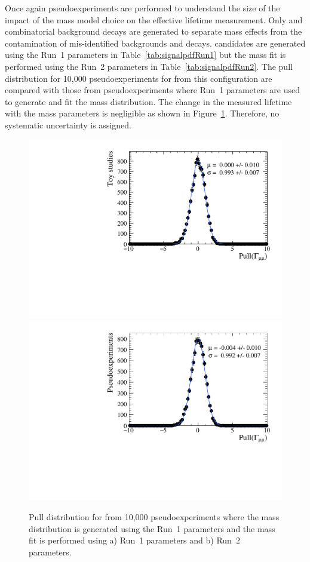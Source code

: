 Once again pseudoexperiments are performed to understand the size of the impact of the mass model choice on the effective lifetime measurement. Only \bsmumu and combinatorial background decays are generated to separate mass \pdf effects from the contamination of mis-identified backgrounds and \bdmumu decays. \bsmumu candidates are generated using the Run~1 parameters in Table~\ref{tab:signalpdfRun1} but the mass fit is performed using the Run~2 parameters in Table~\ref{tab:signalpdfRun2}. The pull distribution for 10,000 pseudoexperiments for \Gmumu from this configuration are compared with those from pseudoexperiments where Run~1 parameters are used to generate and fit the mass distribution. The change in the measured lifetime with the mass \pdf parameters is negligible as shown in Figure~\ref{fig:masspdfsyst}. Therefore, no systematic uncertainty is assigned. 

\begin{figure}[tbp]
    \centering
        \includegraphics[width=0.49 \textwidth]{./Figs/LifetimeSystematics/Gamma_pull_mass_pdf_Run1.pdf}
        \includegraphics[width=0.49 \textwidth]{./Figs/LifetimeSystematics/Gamma_pull_mass_pdf_Run2.pdf}
    \caption{Pull distribution for \Gmumu from 10,000 pseudoexperiments where the \bsmumu mass distribution is generated using the Run~1 parameters and the mass fit is performed using a) Run~1 parameters and b) Run~2 parameters.}
    \label{fig:masspdfsyst}
\end{figure}


